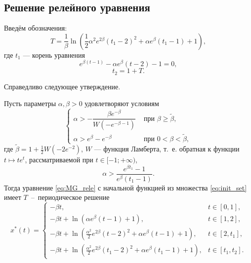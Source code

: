 \subsection{Решение релейного уравнения}
Введём обозначения:
\begin{equation}
    \label{eq:T}
    T = \frac{1}{\beta} \ln\left(\frac{1}{2}\alpha^2e^{2\beta}(t_1 - 2)^2 + \alpha e^{\beta}(t_1 - 1) + 1\right),
\end{equation}
где $t_1$ --- корень уравнения 
\begin{equation}
    \label{eq:t1_cond_exp}
    e^{\beta (t - 1)} - \alpha e^{\beta} (t - 2) - 1 = 0,
\end{equation}
\begin{equation}
    \label{eq:t2_period}
    t_2 = 1 + T.
\end{equation}

Справедливо следующее утверждение.

\begin{theorem}\label{thm:relay}
Пусть параметры $\alpha,\beta>0$ удовлетворяют условиям
%
\begin{equation}
    \label{eq:cond_alpha1}
	\begin{cases}
    \alpha > -\dfrac{\beta e^{-\beta}}{W(-e^{-\beta - 1})} & \text{ при } \beta \geq \tilde{\beta},\\
	\alpha > e^{\beta} - e^{-\beta} & \text{ при } 0 < \beta < \tilde{\beta},
	\end{cases}
\end{equation}
где $\tilde{\beta} = 1 + \frac{1}{2} W(-2 e^{-2})$, $W$ --- функция Ламберта, т.~е. обратная к функции $t \mapsto te^t$, рассматриваемой при $t \in [-1; +\infty)$,
\begin{equation}
    \label{eq:cond_alpha2}
    \alpha > \dfrac{e^{\beta t_1} - 1}{e^{\beta}(t_1 - 1)}.
\end{equation}
%
Тогда уравнение \eqref{eq:MG_rele} с начальной функцией из множества \eqref{eq:init_set} имеет $T$~--~периодическое решение
\small
\begin{equation}
    \label{eq:sol_x*}
x^*(t)= 
\begin{cases}
    -\beta t, & t\in[0, 1],\\
    -\beta t +\ln(\alpha e^{\beta}(t - 1)+1), & t\in[1, 2],\\
    -\beta t + \ln(\frac{\alpha^2}{2}e^{2\beta}(t - 2)^2+\alpha e^{\beta}(t - 1)+1), & t\in[2, t_1],\\
    -\beta t + \ln(\frac{\alpha^2}{2}e^{2\beta}(t_1 - 2)^2+\alpha e^{\beta}(t_1 - 1) + 1), & t\in[t_1, t_2].
\end{cases}
\end{equation}
\normalsize
\end{theorem}


